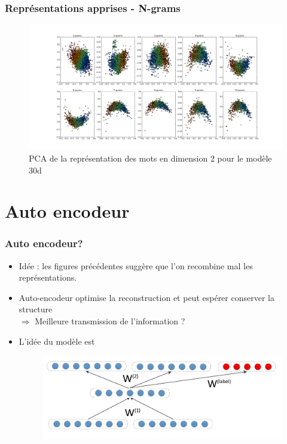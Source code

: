 \documentclass{beamer}
\begin{document}
\begin{frame}
\frametitle{Représentations apprises - N-grams}
\begin{figure}[htp]
\centering
\includegraphics[scale=0.2]{fig/n_gram.png}
\caption[caption]{PCA de la représentation des mots en dimension 2 pour le modèle 30d}
\end{figure}
\end{frame}


\section{Auto encodeur}
\begin{frame}
\frametitle{Auto encodeur?}
\begin{itemize}
\item Idée : les figures précédentes suggère que l'on recombine mal les représentations.
\item Auto-encodeur optimise la reconstruction et peut espérer conserver la structure \\
$\Rightarrow$ Meilleure transmission de l'information ?
\item L'idée du modèle est
\begin{figure}[htp]
\centering
\includegraphics[scale=0.2]{fig/model_RAE.png}
\label{}
\end{figure}
\end{itemize}
\end{frame}
\end{document}
